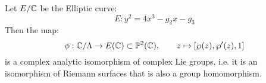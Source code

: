 \documentclass[12pt]{article}
\begin{document}
\begin{prop}
    Let $E/\mathbb C$ be the Elliptic curve:
    \[E : y^2 = 4x^3 - g_2x -g_3 \]
    Then the map: 
    \[ \phi: \mathbb C/\Lambda \to E(\mathbb C) \subset \mathbb P^2(\mathbb C), \qquad z \mapsto [\wp(z), \wp'(z), 1]\]
    is a complex analytic isomorphism of complex Lie groups, i.e. it is an isomorphism of Riemann surfaces that is also a group homomorphism. 
\end{prop}
\end{document}
